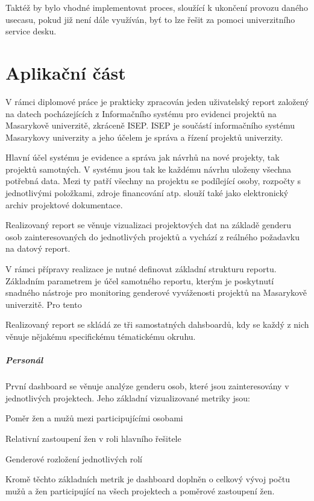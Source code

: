 \documentclass[
  digital,     %
  twoside,     %
  lof,         %
  lot,         %
]{fithesis4}
\begin{document}
Taktéž by bylo vhodné implementovat proces, sloužící k ukončení provozu daného usecasu, pokud již není dále využíván, byť to lze řešit za pomoci univerzitního service desku.



\chapter{Aplikační část}
V rámci diplomové práce je prakticky zpracován jeden uživatelský report založený na datech pocházejících z Informačního systému pro evidenci projektů na Masarykově univerzitě, zkráceně ISEP. ISEP je součástí informačního systému Masarykovy univerzity a jeho účelem je správa a řízení projektů univerzity. 

Hlavní účel systému je evidence a správa jak návrhů na nové projekty, tak projektů samotných. V systému jsou tak ke každému návrhu uloženy všechna potřebná data. Mezi ty patří všechny na projektu se podílející osoby, rozpočty s jednotlivými položkami, zdroje financování atp. slouží také jako elektronický archiv projektové dokumentace.

Realizovaný report se věnuje vizualizaci projektových dat na základě genderu osob zainteresovaných do jednotlivých projektů a vychází z reálného požadavku na datový report.

V rámci přípravy realizace je nutné definovat základní strukturu reportu. Základním parametrem je účel samotného reportu, kterým je poskytnutí snadného nástroje pro monitoring genderové vyváženosti projektů na Masarykově univerzitě. Pro tento

Realizovaný report se skládá ze tři samostatných dahsboardů, kdy se každý z nich věnuje nějakému specifickému tématickému okruhu. 
\paragraph{Personál} První dashboard se věnuje analýze genderu osob, které jsou zainteresovány v jednotlivých projektech. Jeho základní vizualizované metriky jsou: 
\begin{compactitem}
    \item Poměr žen a mužů mezi participujícími osobami
    \item Relativní zastoupení žen v roli hlavního řešitele
    \item Genderové rozložení jednotlivých rolí
\end{compactitem}
Kromě těchto základních metrik je dashboard doplněn o celkový vývoj počtu mužů a žen participující na všech projektech a poměrové zastoupení žen.
\end{document}
